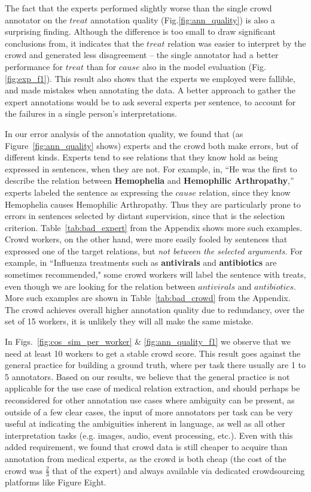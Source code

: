 The fact that the experts performed slightly worse than the single crowd annotator on the $treat$ annotation quality (Fig.\ref{fig:ann_quality}) is also a surprising finding. Although the difference is too small to draw significant conclusions from, it indicates that the $treat$ relation was easier to interpret by the crowd and generated less disagreement -- the single annotator had a better performance for $treat$ than for $cause$ also in the model evaluation (Fig.\ref{fig:exp_f1}). This result also shows that the experts we employed were fallible, and made mistakes when annotating the data. A better approach to gather the expert annotations would be to ask several experts per sentence, to account for the failures in a single person's interpretations.

In our error analysis of the annotation quality, we found that (as Figure~\ref{fig:ann_quality} shows) experts and the crowd both make errors, but of different kinds.  Experts tend to see relations that they know hold as being expressed in sentences, when they are not.  For example, in, ``He was the first to describe the relation between \textbf{Hemophelia} and \textbf{Hemophilic Arthropathy},'' experts labeled the sentence as expressing the $cause$ relation, since they know Hemophelia causes Hemophilic Arthropathy.  Thus they are particularly prone to errors in sentences selected by distant supervision, since that is the selection criterion. Table~\ref{tab:bad_expert} from the Appendix shows more such examples.  Crowd workers, on the other hand, were more easily fooled by sentences that expressed one of the target relations, but {\em not between the selected arguments.}  For example, in ``Influenza treatments such as \textbf{antivirals} and \textbf{antibiotics} are sometimes recommended," some crowd workers will label the sentence with treats, even though we are looking for the relation between $antivirals$ and $antibiotics$. More such examples are shown in Table~\ref{tab:bad_crowd} from the Appendix. The crowd achieves overall higher annotation quality due to redundancy, over the set of 15 workers, it is unlikely they will all make the same mistake.

In Figs.~\ref{fig:cos_sim_per_worker} \& \ref{fig:ann_quality_f1} we observe that we need at least 10 workers to get a stable crowd score. This result goes against the general practice for building a ground truth, where per task there usually are 1 to 5 annotators. Based on our results, we believe that the general practice is not applicable for the use case of medical relation extraction, and should perhaps be reconsidered for other annotation use cases where ambiguity can be present, as outside of a few clear cases, the input of more annotators per task can be very useful at indicating the ambiguities inherent in language, as well as all other interpretation tasks (e.g. images, audio, event processing, etc.). Even with this added requirement, we found that crowd data is still cheaper to acquire than annotation from medical experts, as the crowd is both cheap (the cost of the crowd was $\frac{2}{3}$ that of the expert) and always available via dedicated crowdsourcing platforms like Figure Eight.

